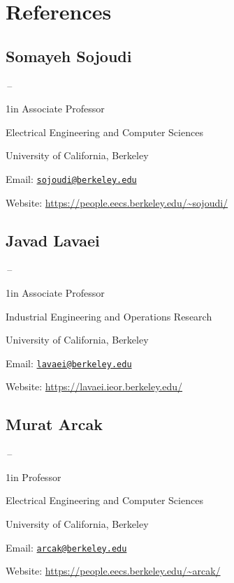 \documentclass[11pt]{article}
\newcommand{\sectionwidth}{1in}		%
\newcommand{\subsectionskip}{\baselineskip}	%
\newcommand{\cvdates}[2]{\hfill#1\,--\,#2}	%
\begin{document}
	\newpage
	\section{References}

	\subsection{Somayeh Sojoudi}
	\cvdates{}{}

	\begin{adjustwidth}{\sectionwidth}{}
	Associate Professor

	Electrical Engineering and Computer Sciences

	University of California, Berkeley
	
	Email: \href{mailto:sojoudi@berkeley.edu}{\texttt{sojoudi@berkeley.edu}}

	Website: \url{https://people.eecs.berkeley.edu/~sojoudi/}
	\end{adjustwidth}

	\vspace*{\subsectionskip}

	\subsection{Javad Lavaei}
	\cvdates{}{}

	\begin{adjustwidth}{\sectionwidth}{}
	Associate Professor

	Industrial Engineering and Operations Research

	University of California, Berkeley

	Email: \href{mailto:lavaei@berkeley.edu}{\texttt{lavaei@berkeley.edu}}

	Website: \url{https://lavaei.ieor.berkeley.edu/}
	\end{adjustwidth}
	
	\vspace*{\subsectionskip}

	\subsection{Murat Arcak}
	\cvdates{}{}

	\begin{adjustwidth}{\sectionwidth}{}
	Professor

	Electrical Engineering and Computer Sciences

	University of California, Berkeley

	Email: \href{mailto:arcak@berkeley.edu}{\texttt{arcak@berkeley.edu}}

	Website: \url{https://people.eecs.berkeley.edu/~arcak/}
	\end{adjustwidth}
\end{document}
